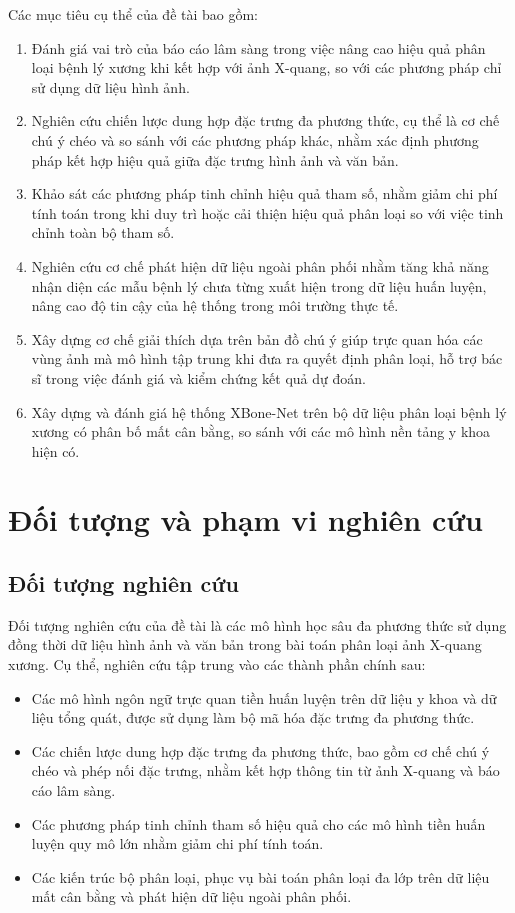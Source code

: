 Các mục tiêu cụ thể của đề tài bao gồm:
\begin{enumerate}
  \item Đánh giá vai trò của báo cáo lâm sàng trong việc nâng cao hiệu quả phân loại bệnh lý xương khi kết hợp với ảnh X-quang, so với các phương pháp chỉ sử dụng dữ liệu hình ảnh.
  \item Nghiên cứu chiến lược dung hợp đặc trưng đa phương thức, cụ thể là cơ chế chú ý chéo và so sánh với các phương pháp khác, nhằm xác định phương pháp kết hợp hiệu quả giữa đặc trưng hình ảnh và văn bản.
  \item Khảo sát các phương pháp tinh chỉnh hiệu quả tham số, nhằm giảm chi phí tính toán trong khi duy trì hoặc cải thiện hiệu quả phân loại so với việc tinh chỉnh toàn bộ tham số.
  \item Nghiên cứu cơ chế phát hiện dữ liệu ngoài phân phối nhằm tăng khả năng nhận diện các mẫu bệnh lý chưa từng xuất hiện trong dữ liệu huấn luyện, nâng cao độ tin cậy của hệ thống trong môi trường thực tế.
  \item Xây dựng cơ chế giải thích dựa trên bản đồ chú ý giúp trực quan hóa các vùng ảnh mà mô hình tập trung khi đưa ra quyết định phân loại, hỗ trợ bác sĩ trong việc đánh giá và kiểm chứng kết quả dự đoán.
  \item Xây dựng và đánh giá hệ thống XBone-Net trên bộ dữ liệu phân loại bệnh lý xương có phân bố mất cân bằng, so sánh với các mô hình nền tảng y khoa hiện có.
\end{enumerate}

\section{Đối tượng và phạm vi nghiên cứu}
\subsection{Đối tượng nghiên cứu}
Đối tượng nghiên cứu của đề tài là các mô hình học sâu đa phương thức sử dụng đồng thời dữ liệu hình ảnh và văn bản trong bài toán phân loại ảnh X-quang xương. Cụ thể, nghiên cứu tập trung vào các thành phần chính sau:

\begin{itemize}
  \item Các mô hình ngôn ngữ trực quan tiền huấn luyện trên dữ liệu y khoa và dữ liệu tổng quát, được sử dụng làm bộ mã hóa đặc trưng đa phương thức.
  \item Các chiến lược dung hợp đặc trưng đa phương thức, bao gồm cơ chế chú ý chéo và phép nối đặc trưng, nhằm kết hợp thông tin từ ảnh X-quang và báo cáo lâm sàng.
  \item Các phương pháp tinh chỉnh tham số hiệu quả cho các mô hình tiền huấn luyện quy mô lớn nhằm giảm chi phí tính toán.
  \item Các kiến trúc bộ phân loại, phục vụ bài toán phân loại đa lớp trên dữ liệu mất cân bằng và phát hiện dữ liệu ngoài phân phối.
\end{itemize}

